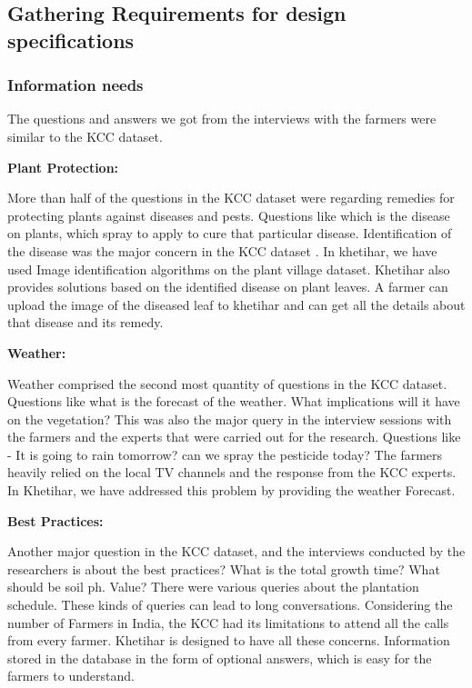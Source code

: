 \documentclass[10pt,conference]{IEEEtran}
\begin{document}
\subsection{Gathering Requirements for design specifications }
\subsubsection{Information needs}

{\raggedright
The questions and answers we got from the interviews with the farmers were similar to the KCC dataset.
}

\textbf{Plant Protection:}
{\raggedright
More than half of the questions in the KCC dataset were regarding remedies for protecting plants against diseases and pests. Questions like which is the disease on plants, which spray to apply to cure that particular disease. Identification of the disease was the major concern in the KCC dataset \cite{nagarajah2019review}. In khetihar, we have used Image identification algorithms on the plant village dataset. Khetihar also provides solutions based on the identified disease on plant leaves. A farmer can upload the image of the diseased leaf to khetihar and can get all the details about that disease and its remedy.
}

\textbf{Weather:}
{\raggedright
Weather comprised the second most quantity of questions in the KCC dataset. Questions like what is the forecast of the weather. What implications will it have on the vegetation? This was also the major query in the interview sessions with the farmers and the experts that were carried out for the research. Questions like - It is going to rain tomorrow? can we spray the pesticide today? The farmers heavily relied on the local TV channels and the response from the KCC experts. In Khetihar, we have addressed this problem by providing the weather Forecast.
}

\textbf{Best Practices:}
{\raggedright
Another major question in the KCC dataset, and the interviews conducted by the researchers is about the best practices? What is the total growth time? What should be soil ph. Value? There were various queries about the plantation schedule. These kinds of queries can lead to long conversations. Considering the number of Farmers in India, the KCC had its limitations to attend all the calls from every farmer.  
Khetihar is designed to have all these concerns. Information stored in the database in the form of optional answers, which is easy for the farmers to understand.
}
\end{document}
